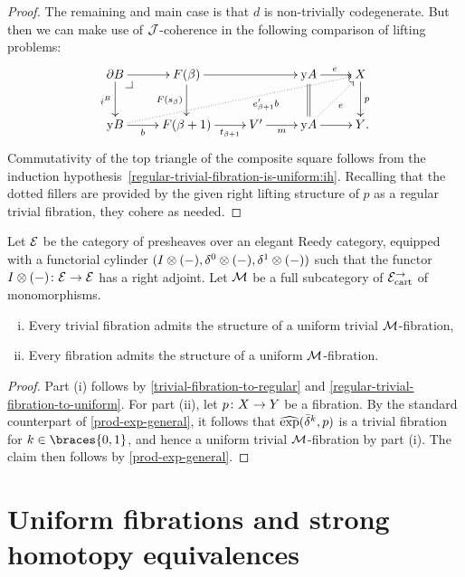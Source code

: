 \documentclass[reqno,10pt,a4paper,oneside,draft]{amsart}
\begin{document}
\begin{proof}
The remaining and main case is that $d$ is non-trivially codegenerate.
But then we can make use of $\cal{J}$-coherence in the following comparison of lifting problems:
\[
\xymatrix{
  \partial B
  \ar[r]
  \ar[d]_{i^B}
  \pullback{dr}
&
  F(\beta)
  \ar[rr]
  \ar[d]_{F(s_{\beta})}
&&
  \yon A
  \ar[r]^{e}
  \ar@{=}[d]
&
  X
  \ar[d]^{p}
\\
  \yon B
  \ar[r]_-{b}
  \ar@{.>}[urrrr]_(0.6){e_{\beta+1}' b}
&
  F(\beta+1)
  \ar[r]_-{t_{\beta+1}}
&
  V'
  \ar[r]_-{m}
&
  \yon A
  \ar[r]
  \ar@{.>}[ur]_{e}
&
  Y
\rlap{.}}
\]
Commutativity of the top triangle of the composite square follows from the induction hypothesis~\eqref{regular-trivial-fibration-is-uniform:ih}.
Recalling that the dotted fillers are provided by the given right lifting structure of $p$ as a regular trivial fibration, they cohere as needed.
\end{proof}

\begin{theorem} \label{thm:ac-kan-is-uniform}
Let $\catE$ be the category of presheaves over an elegant Reedy category, equipped with a functorial cylinder $(\interval \otimes (-), \lcyl \otimes (-), \rcyl \otimes(-))$ such that the functor $\interval \otimes (-) \co \catE \to \catE$ has a right adjoint.
Let $\cal{M}$ be a full subcategory of $\cal{E}_{\cart}^\to$ of monomorphisms.
\begin{enumerate}[(i)]
\item Every trivial fibration admits the structure of a uniform trivial $\cal{M}$-fibration,
\item Every fibration admits the structure of a uniform $\cal{M}$-fibration.
\end{enumerate}
\end{theorem}

\begin{proof}
Part (i) follows by \cref{trivial-fibration-to-regular} and \cref{regular-trivial-fibration-to-uniform}.
For part (ii), let $p \co X \to Y$ be a fibration.
By the standard counterpart of \cref{prod-exp-general}, it follows that $\hatexp(\bar{\delta}^k, p)$ is a trivial fibration for $k \in \braces{0, 1}$, and hence a uniform trivial $\cal{M}$-fibration by part (i).
The claim then follows by \cref{prod-exp-general}.
\end{proof}




\section{Uniform fibrations and strong homotopy equivalences}
\label{sec:unifshe}
\end{document}
